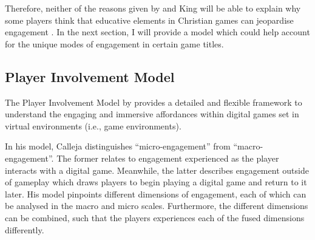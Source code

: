 Therefore, neither of the reasons given by \textcite{repp_whats_2012} and King will be able to explain why some players think that educative elements in Christian games can jeopardise engagement \parencite{arkane_review_2015, moon_channel_why_2023}. In the next section, I will provide a model which could help account for the unique modes of engagement in certain game titles.

\subsection{Player Involvement Model} \label{sec:player_involvement_model}



The Player Involvement Model by \textcite{calleja_in_game_2011} provides a detailed and flexible framework to understand the engaging and immersive affordances within digital games set in virtual environments (i.e., game environments).




In his model, Calleja distinguishes ``micro-engagement'' from ``macro-engagement''. The former relates to engagement experienced as the player interacts with a digital game. Meanwhile, the latter describes engagement outside of gameplay which draws players to begin playing a digital game and return to it later. His model pinpoints different dimensions of engagement, each of which can be analysed in the macro and micro scales. Furthermore, the different dimensions can be combined, such that the players experiences each of the fused dimensions differently.

